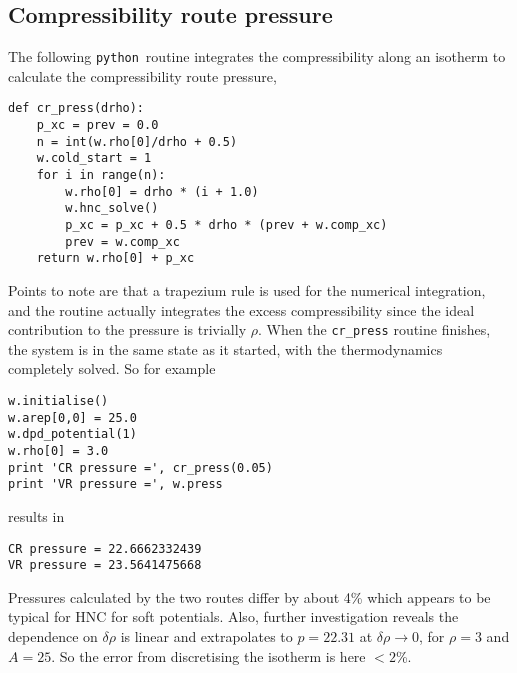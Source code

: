 \documentclass[12pt,a4paper]{article}
\newcommand{\python}{{\tt python}}
\begin{document}
\subsection{Compressibility route pressure}
%
The following \python\ routine integrates the compressibility along an
isotherm to calculate the compressibility route pressure,
%
\begin{verbatim}
def cr_press(drho):
    p_xc = prev = 0.0
    n = int(w.rho[0]/drho + 0.5)
    w.cold_start = 1
    for i in range(n):
        w.rho[0] = drho * (i + 1.0)
        w.hnc_solve()
        p_xc = p_xc + 0.5 * drho * (prev + w.comp_xc)
        prev = w.comp_xc
    return w.rho[0] + p_xc
\end{verbatim}
%
Points to note are that a trapezium rule is used for the numerical
integration, and the routine actually integrates the excess
compressibility since the ideal contribution to the pressure is
trivially $\rho$.  When the \verb+cr_press+ routine finishes, the
system is in the same state as it started, with the thermodynamics
completely solved.  So for example
%
\begin{verbatim}
w.initialise()
w.arep[0,0] = 25.0
w.dpd_potential(1)
w.rho[0] = 3.0
print 'CR pressure =', cr_press(0.05)
print 'VR pressure =', w.press
\end{verbatim}
%
results in
%
\begin{verbatim}
CR pressure = 22.6662332439
VR pressure = 23.5641475668
\end{verbatim}
%
Pressures calculated by the two routes differ by about 4\%
which appears to be typical for HNC for soft potentials.  Also,
further investigation reveals the dependence on $\delta\rho$ is linear
and extrapolates to $p=22.31$ at $\delta\rho\to0$, for $\rho=3$ and
$A=25$.  So the error from discretising the isotherm is here $<2$\%.
\end{document}
